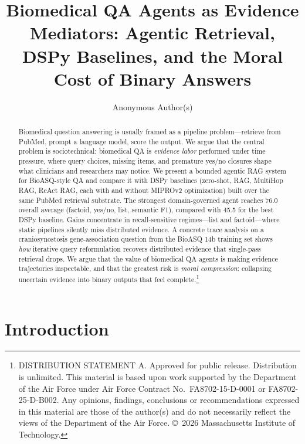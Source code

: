 \documentclass[sigconf,anonymous,review]{acmart}
\begin{document}
\title{Biomedical QA Agents as Evidence Mediators: Agentic Retrieval, DSPy Baselines, and the Moral Cost of Binary Answers}

\author{Anonymous Author(s)}

\begin{abstract}
Biomedical question answering is usually framed as a pipeline problem---retrieve from PubMed, prompt a language model, score the output.
We argue that the central problem is sociotechnical: biomedical QA is \emph{evidence labor} performed under time pressure, where query choices, missing items, and premature yes/no closures shape what clinicians and researchers may notice.
We present a bounded agentic RAG system for BioASQ-style QA and compare it with DSPy baselines (zero-shot, RAG, MultiHop RAG, ReAct RAG, each with and without MIPROv2 optimization) built over the same PubMed retrieval substrate.
The strongest domain-governed agent reaches 76.0 overall average (factoid, yes/no, list, semantic F1), compared with 45.5 for the best DSPy baseline.
Gains concentrate in recall-sensitive regimes---list and factoid---where static pipelines silently miss distributed evidence.
A concrete trace analysis on a craniosynostosis gene-association question from the BioASQ 14b training set shows \emph{how} iterative query reformulation recovers distributed evidence that single-pass retrieval drops.
We argue that the value of biomedical QA agents is making evidence trajectories inspectable, and that the greatest risk is \emph{moral compression}: collapsing uncertain evidence into binary outputs that feel complete.\footnote{DISTRIBUTION STATEMENT A. Approved for public release. Distribution is unlimited. This material is based upon work supported by the Department of the Air Force under Air Force Contract No.\ FA8702-15-D-0001 or FA8702-25-D-B002. Any opinions, findings, conclusions or recommendations expressed in this material are those of the author(s) and do not necessarily reflect the views of the Department of the Air Force. \copyright\ 2026 Massachusetts Institute of Technology.}
\end{abstract}


\maketitle

\section{Introduction}
\end{document}
